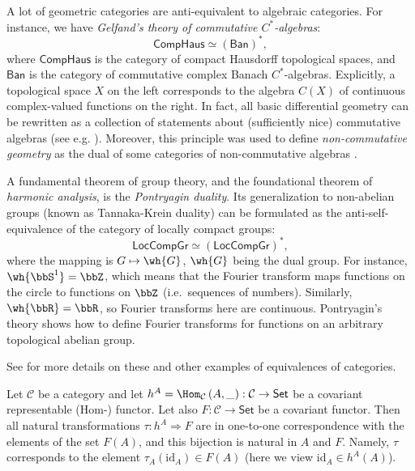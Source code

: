 \begin{example}
A lot of geometric categories are anti-equivalent to algebraic categories.
For instance, we have \emph{Gelfand's theory of commutative $C^{\ast}$-algebras}:
\[
\mathsf{CompHaus}\simeq\left(\mathsf{Ban}\right)^{\ast},
\]
where $\mathsf{CompHaus}$ is the category of compact Hausdorff topological
spaces, and $\mathsf{Ban}$ is the category of commutative complex
Banach $C^{\ast}$-algebras. Explicitly, a topological space $X$
on the left corresponds to the algebra $C\left(X\right)$ of continuous
complex-valued functions on the right. In fact, all basic differential
geometry can be rewritten as a collection of statements about (sufficiently nice)
commutative algebras (see e.g. \cite{JetNest}). Moreover, this principle was used to define \emph{non-commutative geometry} as the dual of some categories of non-commutative algebras \cite{Connes}.
\end{example}
%
\begin{example}
A fundamental theorem of group theory, and the foundational theorem
of \emph{harmonic analysis}, is the \emph{Pontryagin duality}.
Its generalization to non-abelian groups (known as Tannaka-Krein duality)
can be formulated as the anti-self-equivalence of the category of
locally compact groups:
\[
\mathsf{LocCompGr}\simeq\left(\mathsf{LocCompGr}\right)^{\ast},
\]
where the mapping is $G\mapsto\wh{G}$, $\wh{G}$ being the dual
group. For instance, $\wh{\bbS^{1}}=\bbZ$, which means that the
Fourier transform maps functions on the circle to functions on $\bbZ$
(i.e.\ sequences of numbers). Similarly, $\wh{\bbR }=\bbR $,
so Fourier transforms here are continuous. Pontryagin's theory shows
how to define Fourier transforms for functions on an arbitrary topological
abelian group.

See \cite[II.2]{GelMan} for more details on these and other examples
of equivalences of categories.
\end{example}
\begin{thm}\label{Yoneda}
Let $\mathcal{C}$ be a category and let $h^{A}=\Hom_{\mathcal{C}}\left(A,\_\right):\mathcal{C}\to\mathsf{Set}$
be a covariant representable (Hom-) functor. Let also $F:\mathcal{C}\to\mathsf{Set}$
be a covariant functor. Then all natural transformations $\tau:h^{A}\Longrightarrow F$
are in one-to-one correspondence with the elements of the set $F(A)$,
and this bijection is natural in $A$ and $F$. Namely, $\tau$ corresponds to the element $\tau_A(\mathrm{id}_A)\in F(A)$ (here we view $\mathrm{id}_A\in h^A(A)$).
\end{thm}
